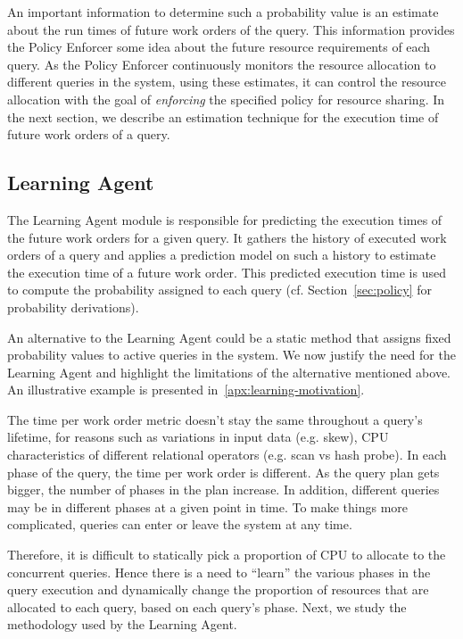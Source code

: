 An important information to determine such a probability value is an estimate about the run times of future work orders of the query.
This information provides the Policy Enforcer some idea about the future resource requirements of each query.
As the Policy Enforcer continuously monitors the resource allocation to different queries in the system, using these estimates, it can control the resource allocation with the goal of \textit{enforcing} the specified policy for resource sharing. 
In the next section, we describe an estimation technique for the execution time of future work orders of a query.
\subsection{Learning Agent}\label{ssec:learning}
The Learning Agent module is responsible for predicting the execution times of the future work orders for a given query. 
It gathers the history of executed work orders of a query and applies a prediction model on such a history to estimate the execution time of a future work order.
This predicted execution time is used to compute the probability assigned to each query (cf. Section~\ref{sec:policy} for probability derivations).

An alternative to the Learning Agent could be a static method that assigns fixed probability values to active queries in the system. 
We now justify the need for the Learning Agent and highlight the limitations of the alternative mentioned above.
An illustrative example is presented in~\ref{apx:learning-motivation}.

The time per work order metric doesn't stay the same throughout a query's lifetime, for reasons such as variations in input data (e.g. skew), CPU characteristics of different relational operators (e.g. scan vs hash probe).
In each phase of the query, the time per work order is different.
As the query plan gets bigger, the number of phases in the plan increase.
In addition, different queries may be in different phases at a given point in time.
To make things more complicated, queries can enter or leave the system at any time.

Therefore, it is difficult to statically pick a proportion of CPU to allocate to the concurrent queries. 
Hence there is a need to ``learn'' the various phases in the query execution and dynamically change the proportion of resources that are allocated to each query, based on each query's phase.
Next, we study the methodology used by the Learning Agent.

